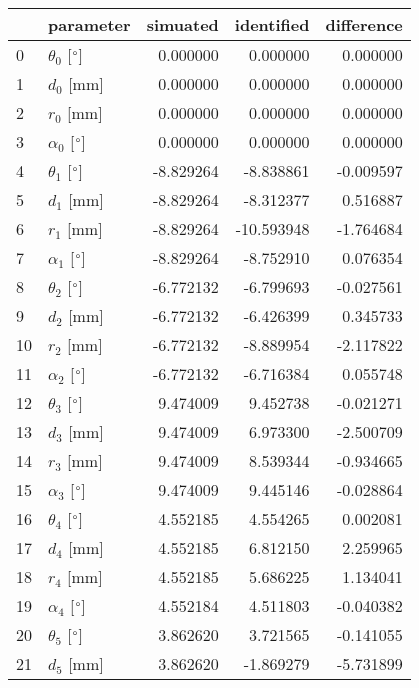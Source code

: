 \documentclass{standalone}%
\begin{document}
%
\normalsize%
\begin{tabular}{llrrr}
\toprule
{} &                 parameter &  simuated & identified & difference \\
\midrule
0  &  $\theta_{0}$ [$\degree$] &  0.000000 &   0.000000 &   0.000000 \\
1  &              $d_{0}$ [mm] &  0.000000 &   0.000000 &   0.000000 \\
2  &              $r_{0}$ [mm] &  0.000000 &   0.000000 &   0.000000 \\
3  &  $\alpha_{0}$ [$\degree$] &  0.000000 &   0.000000 &   0.000000 \\
4  &  $\theta_{1}$ [$\degree$] & -8.829264 &  -8.838861 &  -0.009597 \\
5  &              $d_{1}$ [mm] & -8.829264 &  -8.312377 &   0.516887 \\
6  &              $r_{1}$ [mm] & -8.829264 & -10.593948 &  -1.764684 \\
7  &  $\alpha_{1}$ [$\degree$] & -8.829264 &  -8.752910 &   0.076354 \\
8  &  $\theta_{2}$ [$\degree$] & -6.772132 &  -6.799693 &  -0.027561 \\
9  &              $d_{2}$ [mm] & -6.772132 &  -6.426399 &   0.345733 \\
10 &              $r_{2}$ [mm] & -6.772132 &  -8.889954 &  -2.117822 \\
11 &  $\alpha_{2}$ [$\degree$] & -6.772132 &  -6.716384 &   0.055748 \\
12 &  $\theta_{3}$ [$\degree$] &  9.474009 &   9.452738 &  -0.021271 \\
13 &              $d_{3}$ [mm] &  9.474009 &   6.973300 &  -2.500709 \\
14 &              $r_{3}$ [mm] &  9.474009 &   8.539344 &  -0.934665 \\
15 &  $\alpha_{3}$ [$\degree$] &  9.474009 &   9.445146 &  -0.028864 \\
16 &  $\theta_{4}$ [$\degree$] &  4.552185 &   4.554265 &   0.002081 \\
17 &              $d_{4}$ [mm] &  4.552185 &   6.812150 &   2.259965 \\
18 &              $r_{4}$ [mm] &  4.552185 &   5.686225 &   1.134041 \\
19 &  $\alpha_{4}$ [$\degree$] &  4.552184 &   4.511803 &  -0.040382 \\
20 &  $\theta_{5}$ [$\degree$] &  3.862620 &   3.721565 &  -0.141055 \\
21 &              $d_{5}$ [mm] &  3.862620 &  -1.869279 &  -5.731899 \\

\end{tabular}
\end{document}
